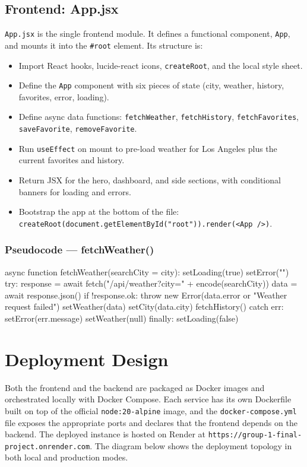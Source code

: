 \documentclass[11pt,letterpaper]{article}
\begin{document}
\subsection{Frontend: App.jsx}
\texttt{App.jsx} is the single frontend module. It defines a functional component, \texttt{App}, and mounts it into the \texttt{\#root} element. Its structure is:
\begin{itemize}
  \item Import React hooks, lucide-react icons, \texttt{createRoot}, and the local style sheet.
  \item Define the \texttt{App} component with six pieces of state (city, weather, history, favorites, error, loading).
  \item Define async data functions: \texttt{fetchWeather}, \texttt{fetchHistory}, \texttt{fetchFavorites}, \texttt{saveFavorite}, \texttt{removeFavorite}.
  \item Run \texttt{useEffect} on mount to pre-load weather for Los Angeles plus the current favorites and history.
  \item Return JSX for the hero, dashboard, and side sections, with conditional banners for loading and errors.
  \item Bootstrap the app at the bottom of the file: \texttt{createRoot(document.getElementById("root")).render(<App />)}.
\end{itemize}

\subsubsection*{Pseudocode --- fetchWeather()}
\begin{codeblock}
async function fetchWeather(searchCity = city):
    setLoading(true)
    setError("")
    try:
        response = await fetch("/api/weather?city=" + encode(searchCity))
        data     = await response.json()
        if !response.ok:
            throw new Error(data.error or "Weather request failed")
        setWeather(data)
        setCity(data.city)
        fetchHistory()
    catch err:
        setError(err.message)
        setWeather(null)
    finally:
        setLoading(false)
\end{codeblock}

\section{Deployment Design}
Both the frontend and the backend are packaged as Docker images and orchestrated locally with Docker Compose. Each service has its own Dockerfile built on top of the official \texttt{node:20-alpine} image, and the \texttt{docker-compose.yml} file exposes the appropriate ports and declares that the frontend depends on the backend. The deployed instance is hosted on Render at \texttt{https://group-1-final-project.onrender.com}. The diagram below shows the deployment topology in both local and production modes.
\end{document}
